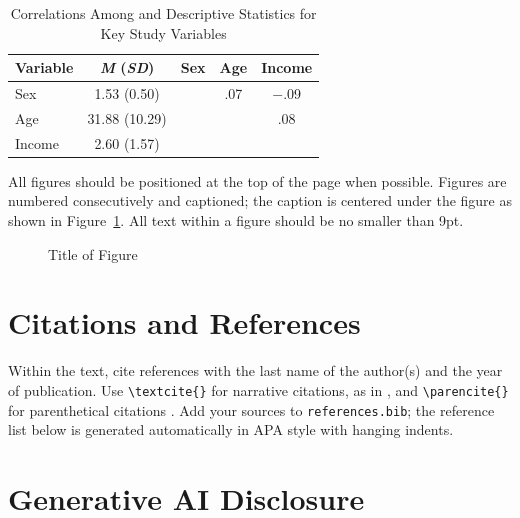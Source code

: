 \documentclass[10pt,letterpaper]{article}
\begin{document}
\begin{table}[t]
  \centering
  \caption{Correlations Among and Descriptive Statistics for Key Study Variables}
  \label{tab:example}
  \small
  \begin{tabular}{lcccc}
    \toprule
    Variable  & \textit{M} (\textit{SD}) & Sex & Age  & Income \\
    \midrule
    Sex       & 1.53 (0.50)   &     & .07  & $-$.09 \\
    Age       & 31.88 (10.29) &     &      & .08    \\
    Income    & 2.60 (1.57)   &     &      &        \\
    \bottomrule
  \end{tabular}
\end{table}

All figures should be positioned at the top of the page when possible. Figures are numbered
consecutively and captioned; the caption is centered under the figure as shown in
Figure~\ref{fig:example}. All text within a figure should be no smaller than 9pt.

\begin{figure}[t]
  \centering
  \caption{Title of Figure}
  \label{fig:example}
\end{figure}

\section{Citations and References}

Within the text, cite references with the last name of the author(s) and the year of
publication. Use \verb|\textcite{}| for narrative citations, as in \textcite{sage2009},
and \verb|\parencite{}| for parenthetical citations \parencite{blanchard2011}. Add
your sources to \texttt{references.bib}; the reference list below is generated
automatically in APA style with hanging indents.

\section{Generative AI Disclosure}
\end{document}
